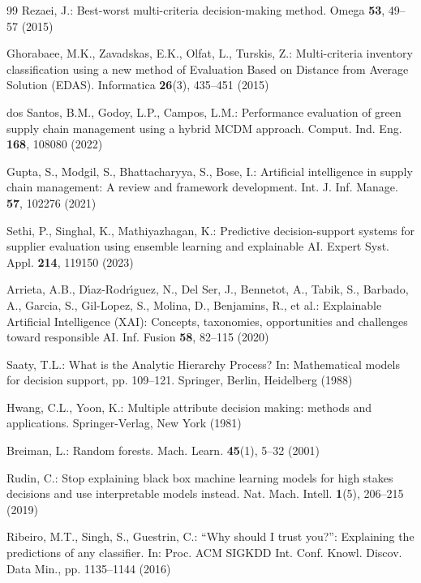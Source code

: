 \documentclass[twocolumn,10pt]{article}
\begin{document}
\begin{thebibliography}{99}
Rezaei, J.: Best-worst multi-criteria decision-making method. Omega \textbf{53}, 49--57 (2015)

Ghorabaee, M.K., Zavadskas, E.K., Olfat, L., Turskis, Z.: Multi-criteria inventory classification using a new method of Evaluation Based on Distance from Average Solution (EDAS). Informatica \textbf{26}(3), 435--451 (2015)

dos Santos, B.M., Godoy, L.P., Campos, L.M.: Performance evaluation of green supply chain management using a hybrid MCDM approach. Comput. Ind. Eng. \textbf{168}, 108080 (2022)

Gupta, S., Modgil, S., Bhattacharyya, S., Bose, I.: Artificial intelligence in supply chain management: A review and framework development. Int. J. Inf. Manage. \textbf{57}, 102276 (2021)

Sethi, P., Singhal, K., Mathiyazhagan, K.: Predictive decision-support systems for supplier evaluation using ensemble learning and explainable AI. Expert Syst. Appl. \textbf{214}, 119150 (2023)

Arrieta, A.B., D{\'\i}az-Rodr{\'\i}guez, N., Del Ser, J., Bennetot, A., Tabik, S., Barbado, A., Garcia, S., Gil-Lopez, S., Molina, D., Benjamins, R., et al.: Explainable Artificial Intelligence (XAI): Concepts, taxonomies, opportunities and challenges toward responsible AI. Inf. Fusion \textbf{58}, 82--115 (2020)

Saaty, T.L.: What is the Analytic Hierarchy Process? In: Mathematical models for decision support, pp. 109--121. Springer, Berlin, Heidelberg (1988)

Hwang, C.L., Yoon, K.: Multiple attribute decision making: methods and applications. Springer-Verlag, New York (1981)

Breiman, L.: Random forests. Mach. Learn. \textbf{45}(1), 5--32 (2001)

Rudin, C.: Stop explaining black box machine learning models for high stakes decisions and use interpretable models instead. Nat. Mach. Intell. \textbf{1}(5), 206--215 (2019)

Ribeiro, M.T., Singh, S., Guestrin, C.: ``Why should I trust you?'': Explaining the predictions of any classifier. In: Proc. ACM SIGKDD Int. Conf. Knowl. Discov. Data Min., pp. 1135--1144 (2016)


\end{thebibliography}
\end{document}
